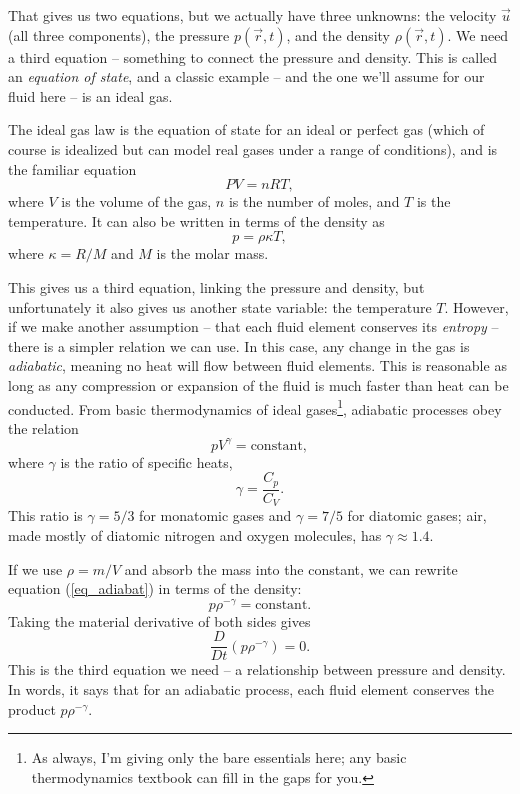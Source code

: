 That gives us two equations, but we actually have three unknowns:  the velocity $\vec{u}$ (all three components), the pressure $p(\vec{r}, t)$, and the density $\rho(\vec{r}, t)$.  We need a third equation -- something to connect the pressure and density.  This is called an \emph{equation of state}, and a classic example -- and the one we'll assume for our fluid here -- is an ideal gas.

The ideal gas law is the equation of state for an ideal or perfect gas (which of course is idealized but can model real gases under a range of conditions), and is the familiar equation
\[
PV = nRT,
\]
where $V$ is the volume of the gas, $n$ is the number of moles, and $T$ is the temperature.  It can also be written in terms of the density as
\begin{equation}
p = \rho \kappa T,
\end{equation}
where $\kappa = R/M$ and $M$ is the molar mass.

This gives us a third equation, linking the pressure and density, but unfortunately it also gives us another state variable:  the temperature $T$.  However, if we make another assumption -- that each fluid element conserves its \emph{entropy} -- there is a simpler relation we can use.  In this case, any change in the gas is \emph{adiabatic}, meaning no heat will flow between fluid elements.  This is reasonable as long as any compression or expansion of the fluid is much faster than heat can be conducted.  From basic thermodynamics of ideal gases\footnote{As always, I'm giving only the bare essentials here; any basic thermodynamics textbook can fill in the gaps for you.}, adiabatic processes obey the relation
\begin{equation}
\label{eq_adiabat}
pV^\gamma = \text{constant},
\end{equation}
where $\gamma$ is the ratio of specific heats,
\[
\gamma = \frac{C_p}{C_V}.
\]
This ratio is $\gamma = 5/3$ for monatomic gases and $\gamma = 7/5$ for diatomic gases; air, made mostly of diatomic nitrogen and oxygen molecules, has $\gamma \approx 1.4$.

If we use $\rho = m/V$ and absorb the mass into the constant, we can rewrite equation (\ref{eq_adiabat}) in terms of the density:
\[
p\rho^{-\gamma} = \text{constant}.
\]
Taking the material derivative of both sides gives
\begin{equation}
\frac{D}{Dt} \left( p \rho^{-\gamma} \right) = 0.
\end{equation}
This is the third equation we need -- a relationship between pressure and density.  In words, it says that for an adiabatic process, each fluid element conserves the product $p\rho^{-\gamma}$.


